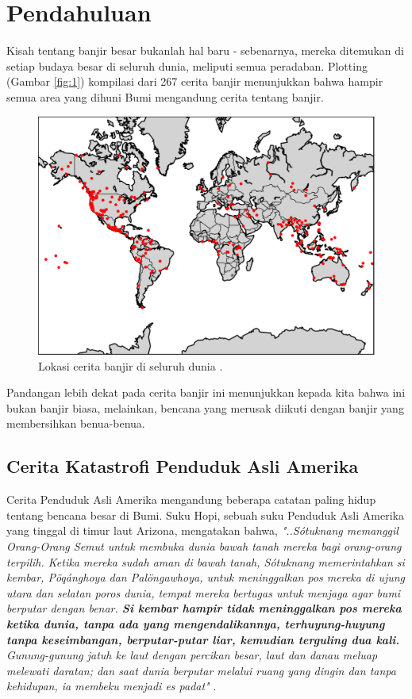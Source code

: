 \documentclass[10pt,twocolumn,letterpaper]{article}
\begin{document}
\section{Pendahuluan}

Kisah tentang banjir besar bukanlah hal baru - sebenarnya, mereka ditemukan di setiap budaya besar di seluruh dunia, meliputi semua peradaban. Plotting (Gambar \ref{fig:1}) kompilasi dari 267 cerita banjir \cite{3} menunjukkan bahwa hampir semua area yang dihuni Bumi mengandung cerita tentang banjir.

\begin{figure}[h]
\begin{center}
   \includegraphics[width=1\linewidth]{b.png}
\end{center}
   \caption{Lokasi cerita banjir di seluruh dunia \cite{3}.}
\label{fig:1}
\label{fig:onecol}
\end{figure}

Pandangan lebih dekat pada cerita banjir ini menunjukkan kepada kita bahwa ini bukan banjir biasa, melainkan, bencana yang merusak diikuti dengan banjir yang membersihkan benua-benua.

\subsection{Cerita Katastrofi Penduduk Asli Amerika}

Cerita Penduduk Asli Amerika mengandung beberapa catatan paling hidup tentang bencana besar di Bumi. Suku Hopi, sebuah suku Penduduk Asli Amerika yang tinggal di timur laut Arizona, mengatakan bahwa, \textit{"..Sótuknang memanggil Orang-Orang Semut untuk membuka dunia bawah tanah mereka bagi orang-orang terpilih. Ketika mereka sudah aman di bawah tanah, Sótuknang memerintahkan si kembar, Pöqánghoya dan Palöngawhoya, untuk meninggalkan pos mereka di ujung utara dan selatan poros dunia, tempat mereka bertugas untuk menjaga agar bumi berputar dengan benar. \textbf{Si kembar hampir tidak meninggalkan pos mereka ketika dunia, tanpa ada yang mengendalikannya, terhuyung-huyung tanpa keseimbangan, berputar-putar liar, kemudian terguling dua kali.} Gunung-gunung jatuh ke laut dengan percikan besar, laut dan danau meluap melewati daratan; dan saat dunia berputar melalui ruang yang dingin dan tanpa kehidupan, ia membeku menjadi es padat"} \cite{4}.
\end{document}

